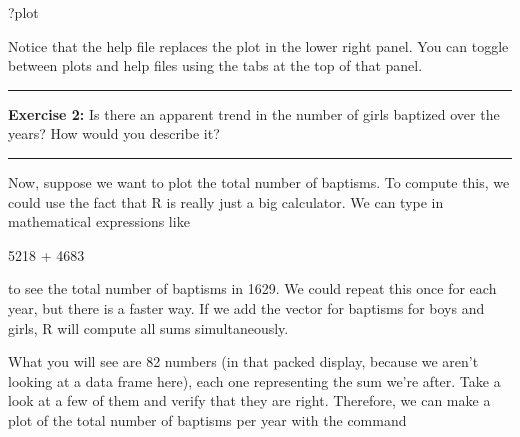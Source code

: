 \documentclass[]{book}
\newenvironment{Shaded}{\begin{snugshade}}{\end{snugshade}}
\newcommand{\KeywordTok}[1]{\textcolor[rgb]{0.13,0.29,0.53}{\textbf{{#1}}}}
\newcommand{\DataTypeTok}[1]{\textcolor[rgb]{0.13,0.29,0.53}{{#1}}}
\newcommand{\DecValTok}[1]{\textcolor[rgb]{0.00,0.00,0.81}{{#1}}}
\newcommand{\StringTok}[1]{\textcolor[rgb]{0.31,0.60,0.02}{{#1}}}
\newcommand{\NormalTok}[1]{{#1}}
\theoremstyle{definition}
\theoremstyle{definition}
\theoremstyle{definition}
\theoremstyle{remark}
\begin{document}
\begin{Shaded}
\begin{Highlighting}[]
\NormalTok{?plot}
\end{Highlighting}
\end{Shaded}

Notice that the help file replaces the plot in the lower right panel.
You can toggle between plots and help files using the tabs at the top of
that panel.

\begin{center}\rule{0.5\linewidth}{\linethickness}\end{center}

\textbf{Exercise 2:} Is there an apparent trend in the number of girls
baptized over the years? How would you describe it?

\begin{center}\rule{0.5\linewidth}{\linethickness}\end{center}

Now, suppose we want to plot the total number of baptisms. To compute
this, we could use the fact that R is really just a big calculator. We
can type in mathematical expressions like

\begin{Shaded}
\begin{Highlighting}[]
\DecValTok{5218} \NormalTok{+}\StringTok{ }\DecValTok{4683}
\end{Highlighting}
\end{Shaded}

to see the total number of baptisms in 1629. We could repeat this once
for each year, but there is a faster way. If we add the vector for
baptisms for boys and girls, R will compute all sums simultaneously.

\begin{Shaded}
\end{Shaded}

What you will see are 82 numbers (in that packed display, because we
aren't looking at a data frame here), each one representing the sum
we're after. Take a look at a few of them and verify that they are
right. Therefore, we can make a plot of the total number of baptisms per
year with the command

\begin{Shaded}
\end{Shaded}
\end{document}
